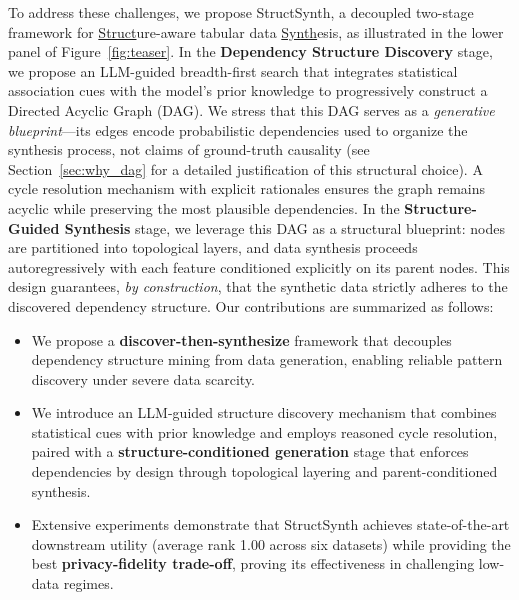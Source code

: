 To address these challenges, we propose \textsf{StructSynth}, a decoupled two-stage framework for \underline{Struct}ure-aware tabular data \underline{Synth}esis, as illustrated in the lower panel of Figure~\ref{fig:teaser}.
In the \textbf{Dependency Structure Discovery} stage, we propose an LLM-guided breadth-first search that integrates statistical association cues 
with the model's prior knowledge to progressively construct a Directed Acyclic Graph (DAG). We stress that this DAG serves as a \emph{generative blueprint}---its edges encode probabilistic dependencies used to organize the synthesis process, not claims of ground-truth causality (see Section~\ref{sec:why_dag} for a detailed justification of this structural choice). A cycle resolution mechanism with explicit rationales ensures the graph remains acyclic while preserving the most plausible dependencies.
In the \textbf{Structure-Guided Synthesis} stage, we leverage this DAG as a structural blueprint: nodes are partitioned into topological layers, and data synthesis proceeds autoregressively with each feature conditioned explicitly on its parent nodes. This design guarantees, \textit{by construction}, that the synthetic data strictly adheres to the discovered dependency structure.
Our contributions are summarized as follows:
\begin{itemize}[leftmargin=*]
    \item We propose a \textbf{discover-then-synthesize} framework that decouples dependency structure mining from data generation, enabling reliable pattern discovery under severe data scarcity.
    \item We introduce an LLM-guided structure discovery mechanism that combines statistical cues with prior knowledge and employs reasoned cycle resolution, paired with a \textbf{structure-conditioned generation} stage that enforces dependencies by design through topological layering and parent-conditioned synthesis.
    \item Extensive experiments demonstrate that \textsf{StructSynth} achieves state-of-the-art downstream utility (average rank 1.00 across six datasets) while providing the best \textbf{privacy-fidelity trade-off}, proving its effectiveness in challenging low-data regimes.
\end{itemize}

